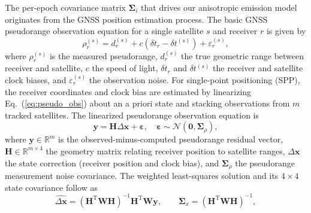 \documentclass[letterpaper,journal]{IEEEtran}
\begin{document}
The per-epoch covariance matrix $\boldsymbol{\Sigma}_i$ that drives our anisotropic emission model originates from the GNSS position estimation process. The basic GNSS pseudorange observation equation for a single satellite $s$ and receiver $r$ is given by
\begin{equation}
\rho_r^{(s)} = d_r^{(s)} + c\left(\delta t_r - \delta t^{(s)}\right) + \varepsilon_r^{(s)},
\label{eq:pseudo_obs}
\end{equation}
where $\rho_r^{(s)}$ is the measured pseudorange, $d_r^{(s)}$ the true geometric range between receiver and satellite, $c$ the speed of light, $\delta t_r$ and $\delta t^{(s)}$ the receiver and satellite clock biases, and $\varepsilon_r^{(s)}$ the observation noise. For single-point positioning (SPP), the receiver coordinates and clock bias are estimated by linearizing Eq.~(\ref{eq:pseudo_obs}) about an a priori state and stacking observations from $m$ tracked satellites. The linearized pseudorange observation equation is
\begin{equation}
\mathbf{y} = \mathbf{H} \Delta\mathbf{x} + \boldsymbol{\varepsilon}, \quad \boldsymbol{\varepsilon} \sim \mathcal{N}(\mathbf{0}, \boldsymbol{\Sigma}_{\rho}),
\label{eq:pseudo_linear}
\end{equation}
where $\mathbf{y} \in \mathbb{R}^{m}$ is the observed-minus-computed pseudorange residual vector, $\mathbf{H} \in \mathbb{R}^{m \times 4}$ the geometry matrix relating receiver position to satellite ranges, $\Delta\mathbf{x}$ the state correction (receiver position and clock bias), and $\boldsymbol{\Sigma}_{\rho}$ the pseudorange measurement noise covariance. The weighted least-squares solution and its $4\times 4$ state covariance follow as~\cite{Zhang2018}
\begin{equation}
\widehat{\Delta\mathbf{x}} = (\mathbf{H}^{\mathrm{T}}\mathbf{W}\mathbf{H})^{-1}\mathbf{H}^{\mathrm{T}}\mathbf{W}\mathbf{y},
\qquad
\boldsymbol{\Sigma}_{x} = (\mathbf{H}^{\mathrm{T}}\mathbf{W}\mathbf{H})^{-1},
\label{eq:wls_cov}
\end{equation}
\end{document}
